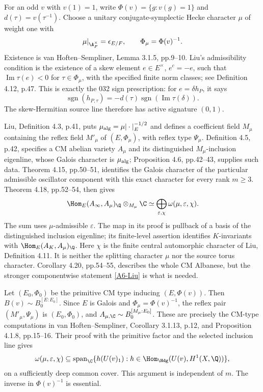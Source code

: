 For an odd $v$ with $v(1)=1$, write
$\Phi(v)=\{g:v(g)=1\}$ and $d(\tau)=v(\tau^{-1})$. Choose a
unitary conjugate-symplectic Hecke character $\mu$ of weight one with
\[
 \mu|_{\A_F^\times}=\epsilon_{E/F},\qquad
 \Phi_\mu=\Phi(v)^{-1}.
\]
Existence is van Hoften--Sempliner, Lemma 3.1.5, pp.9--10.
Liu's admissibility condition is the existence of a skew element
$e\in E^\times$, $e^c=-e$, such that
$\operatorname{Im}\tau(e)<0$ for $\tau\in\Phi_\mu$, with the
specified finite norm classes; see Definition 4.12, p.47. This is
exactly the 032 sign prescription: for $e=\delta h_P$, it says
\[
 \operatorname{sgn}(h_{P,\tau})
   =-d(\tau)\operatorname{sgn}(\operatorname{Im}\tau(\delta)).
\]
The skew-Hermitian source line therefore has active signature
$(0,1)$.

Liu, Definition 4.3, p.41, puts
$\mu_{\rm alg}=\mu|\cdot|_E^{-1/2}$ and defines a coefficient
field $M_\mu$ containing the reflex field $M'_\mu$ of
$(E,\Phi_\mu)$, with reflex type $\Psi_\mu$.
Definition 4.5, p.42, specifies a CM abelian variety $A_\mu$ and its
distinguished $M_\mu$-inclusion eigenline, whose Galois character is
$\mu_{\rm alg}$; Proposition 4.6, pp.42--43, supplies such data.
Theorem 4.15, pp.50--51, identifies the Galois character of the
particular admissible oscillator component with this exact character
for every rank $m\geq3$. Theorem 4.18, pp.52--54, then gives
\begin{equation}\label{A6-Liu}
 \Hom_E(A_\infty,A_\mu)_\Q\otimes_{M_\mu}\C
       \simeq\bigoplus_{\varepsilon,\chi}
                         \omega(\mu,\varepsilon,\chi).
\end{equation}
The sum uses $\mu$-admissible $\varepsilon$. The map in its proof
is pullback of a basis of the distinguished inclusion eigenline;
its finite-level assertion identifies $K$-invariants with
$\Hom_E(A_K,A_\mu)_\Q$. Here $\chi$ is the finite central
automorphic character of Liu, Definition 4.11. It is neither the
splitting character $\mu$ nor the source torus character.
Corollary 4.20, pp.54--55, describes the whole CM Albanese, but the
stronger componentwise statement \eqref{A6-Liu} is what is needed.

Let $(E_0,\Phi_0)$ be the primitive CM type inducing
$(E,\Phi(v))$. Then $B(v)\sim B_0^{[E:E_0]}$. Since $E$ is
Galois and $\Phi_\mu=\Phi(v)^{-1}$, the reflex pair
$(M'_\mu,\Psi_\mu)$ is $(E_0,\Phi_0)$, and
$A_{\mu,\C}\sim B_0^{[M_\mu:E_0]}$. These are precisely the
CM-type computations in van Hoften--Sempliner, Corollary 3.1.13,
p.12, and Proposition 4.1.8, pp.15--16. Their proof with the
primitive factor and the selected inclusion line gives
\begin{equation}\label{A6-extraction}
 \omega(\mu,\varepsilon,\chi)
 \subseteq
 \operatorname{span}_{\C}\{h(U(v)_1):
       h\in\Hom_{\Hdg}(U(v),H^1(X,\Q))\},
\end{equation}
on a sufficiently deep common cover. This argument is independent
of $m$. The inverse in $\Phi(v)^{-1}$ is essential.

